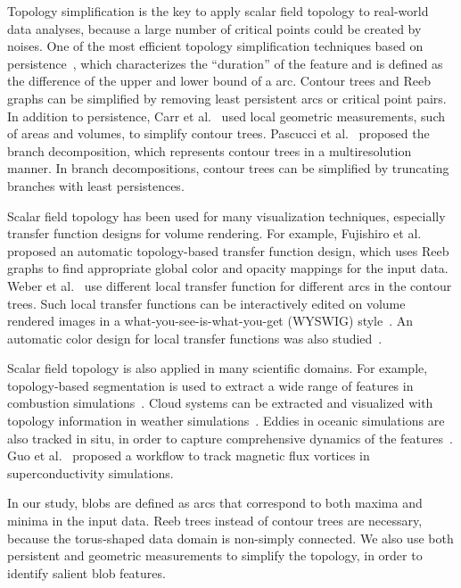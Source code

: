 Topology simplification is the key to apply scalar field topology to real-world data analyses, because a large number of critical points could be created by noises.  One of the most efficient topology simplification techniques based on persistence~\cite{EdelsbrunnerLZ02}, which characterizes the ``duration'' of the feature and is defined as the difference of the upper and lower bound of a arc.  Contour trees and Reeb graphs can be simplified by removing least persistent arcs or critical point pairs.  
In addition to persistence, Carr et al.~\cite{CarrSP04} used local geometric measurements, such of areas and volumes, to simplify contour trees.  Pascucci et al.~\cite{Pascucci2004} proposed the branch decomposition, which represents contour trees in a multiresolution manner.  In branch decompositions, contour trees can be simplified by truncating branches with least persistences.  

Scalar field topology has been used for many visualization techniques, especially transfer function designs for volume rendering.  For example, Fujishiro et al.~\cite{FujishiroAT99} proposed an automatic topology-based transfer function design, which uses Reeb graphs to find appropriate global color and opacity mappings for the input data.  Weber et al.~\cite{WeberDCPH07} use different local transfer function for different arcs in the contour trees.  Such local transfer functions can be interactively edited on volume rendered images in a what-you-see-is-what-you-get (WYSWIG) style~\cite{GuoY13}.  An automatic color design for local transfer functions was also studied~\cite{ZhouT09}.  

Scalar field topology is also applied in many scientific domains.  For example, topology-based segmentation is used to extract a wide range of features in combustion simulations~\cite{LandgePGBKCB14}.  Cloud systems can be extracted and visualized with topology information in weather simulations~\cite{DoraiswamyNN13}.  Eddies in oceanic simulations are also tracked in situ, in order to capture comprehensive dynamics of the features~\cite{WoodringPSPAH16}.  Guo et al.~\cite{GuoPG17} proposed a workflow to track magnetic flux vortices in superconductivity simulations.  

In our study, blobs are defined as arcs that correspond to both maxima and minima in the input data.  Reeb trees instead of contour trees are necessary, because the torus-shaped data domain is non-simply connected.  We also use both persistent and geometric measurements to simplify the topology, in order to identify salient blob features.  


